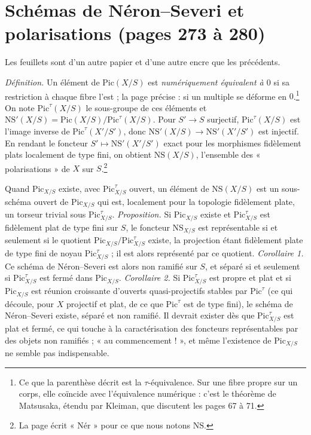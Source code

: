 \documentclass[11pt,a4paper]{article}
\begin{document}
\section*{Schémas de Néron--Severi et polarisations (pages 273 à 280)}

Les feuillets sont d'un autre papier et d'une autre encre que les précédents.

\emph{Définition.} Un élément de $\mathrm{Pic}(X/S)$ est \emph{numériquement
équivalent à $0$} si sa restriction à chaque fibre l'est ; la page précise :
si un multiple se déforme en $0$.\footnote{Ce que la parenthèse décrit est la
$\tau$-équivalence. Sur une fibre propre sur un corps, elle coïncide avec
l'équivalence numérique : c'est le théorème de Matsusaka, étendu par Kleiman,
que discutent les pages 67 à 71.} On note $\mathrm{Pic}^\tau(X/S)$ le
sous-groupe de ces éléments et
$\mathrm{NS}'(X/S) = \mathrm{Pic}(X/S)/\mathrm{Pic}^\tau(X/S)$. Pour
$S' \to S$ surjectif, $\mathrm{Pic}^\tau(X/S)$ est l'image inverse de
$\mathrm{Pic}^\tau(X'/S')$, donc $\mathrm{NS}'(X/S) \to \mathrm{NS}'(X'/S')$ est
injectif. En rendant le foncteur $S' \mapsto \mathrm{NS}'(X'/S')$ exact pour
les morphismes fidèlement plats localement de type fini, on obtient
$\mathrm{NS}(X/S)$, l'ensemble des « polarisations » de $X$ sur
$S$.\footnote{La page écrit « Nér » pour ce que nous notons $\mathrm{NS}$.}

Quand $\mathrm{Pic}_{X/S}$ existe, avec $\mathrm{Pic}^\tau_{X/S}$ ouvert, un
élément de $\mathrm{NS}(X/S)$ est un sous-schéma ouvert de $\mathrm{Pic}_{X/S}$
qui est, localement pour la topologie fidèlement plate, un torseur trivial sous
$\mathrm{Pic}^\tau_{X/S}$. \emph{Proposition.} Si $\mathrm{Pic}_{X/S}$ existe et
$\mathrm{Pic}^\tau_{X/S}$ est fidèlement plat de type fini sur $S$, le foncteur
$\mathrm{NS}_{X/S}$ est représentable si et seulement si le quotient
$\mathrm{Pic}_{X/S}/\mathrm{Pic}^\tau_{X/S}$ existe, la projection étant
fidèlement plate de type fini de noyau $\mathrm{Pic}^\tau_{X/S}$ ; il est alors
représenté par ce quotient. \emph{Corollaire 1.} Ce schéma de Néron--Severi
est alors non ramifié sur $S$, et séparé si et seulement si
$\mathrm{Pic}^\tau_{X/S}$ est fermé dans $\mathrm{Pic}_{X/S}$. \emph{Corollaire 2.}
Si $\mathrm{Pic}^\tau_{X/S}$ est propre et plat et si $\mathrm{Pic}_{X/S}$ est
réunion croissante d'ouverts quasi-projectifs stables par $\mathrm{Pic}^\tau$
(ce qui découle, pour $X$ projectif et plat, de ce que $\mathrm{Pic}^\tau$
est de type fini), le schéma de Néron--Severi existe, séparé et non ramifié.
Il devrait exister dès que $\mathrm{Pic}^\tau_{X/S}$ est plat et fermé, ce qui
touche à la caractérisation des foncteurs représentables par des objets non
ramifiés ; « au commencement ! », et même l'existence de
$\mathrm{Pic}_{X/S}$ ne semble pas indispensable.
\end{document}

